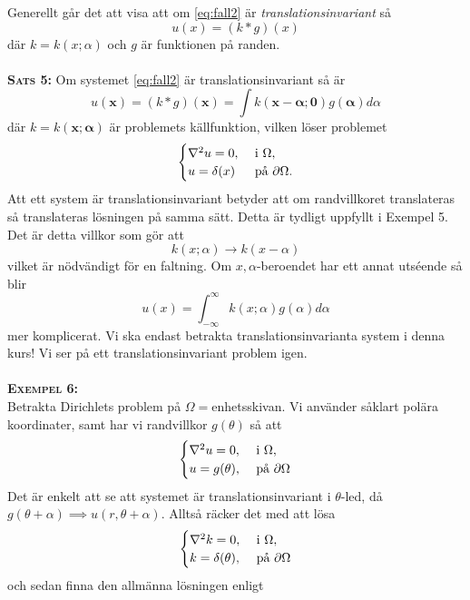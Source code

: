 \documentclass{article}
\begin{document}
Generellt går det att visa att om \eqref{eq:fall2} är \textit{translationsinvariant} så
$$
u(x)=(k*g)(x)
$$
där $k=k(x;\alpha)$ och $g$ är funktionen på randen.\\ \\
\textbf{\textsc{Sats 5:}} Om systemet \eqref{eq:fall2} är translationsinvariant så är 
$$
u(\pmb{x})=(k*g)(\pmb{x})=\int k(\pmb{x}-\pmb{\alpha};\pmb{0})g(\pmb{\alpha})d\alpha
$$
där $k=k(\pmb{x};\pmb{\alpha})$ är problemets källfunktion, vilken löser problemet
\begin{equation}\label{eq:greenprob}
    \begin{cases}
        \nabla^2u=0, \ &$i$ \ \Omega,\\
        u=\delta(x) \ &$på$ \ \partial\Omega.
    \end{cases}
\end{equation}
\newpage
Att ett system är translationsinvariant betyder att om randvillkoret translateras så translateras lösningen på samma sätt. Detta är tydligt uppfyllt i Exempel 5. Det är detta villkor som gör att 
$$
k(x;\alpha)\longrightarrow k(x-\alpha)
$$
vilket är nödvändigt för en faltning. Om $x,\alpha$-beroendet har ett annat utséende så blir 
$$
u(x)=\int_{-\infty}^{\infty}k(x;\alpha)g(\alpha)d\alpha
$$
mer komplicerat. Vi ska endast betrakta translationsinvarianta system i denna kurs! Vi ser på ett translationsinvariant problem igen.\\ \\
\textbf{\textsc{Exempel 6:}}\\
Betrakta Dirichlets problem på $\Omega=$enhetsskivan. Vi använder såklart polära koordinater, samt har vi randvillkor $g(\theta)$ så att
\begin{equation}
    \begin{cases}
        \nabla^2u=0, \ &$i$ \ \Omega,\\ u=g(\theta), \ &$på$ \ \partial\Omega
    \end{cases}
\end{equation}
Det är enkelt att se att systemet är translationsinvariant i $\theta$-led, då $g(\theta+\alpha)\implies u(r,\theta+\alpha)$. Alltså räcker det med att lösa
\begin{equation}
    \begin{cases}
        \nabla^2k=0, \ &$i$ \ \Omega,\\ k=\delta(\theta), \ &$på$ \ \partial\Omega
    \end{cases}
\end{equation}
och sedan finna den allmänna lösningen enligt
\end{document}
